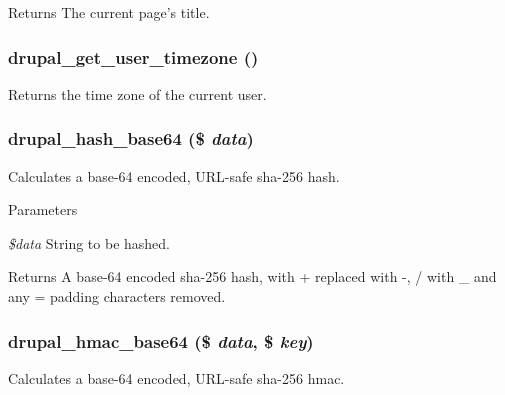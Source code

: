 \begin{DoxyReturn}{Returns}
The current page's title. 
\end{DoxyReturn}
\hypertarget{bootstrap_8inc_aab3e512ebe00778d1f7fe97db22b4d9d}{
\subsubsection[{drupal\_\-get\_\-user\_\-timezone}]{\setlength{\rightskip}{0pt plus 5cm}drupal\_\-get\_\-user\_\-timezone ()}}
\label{bootstrap_8inc_aab3e512ebe00778d1f7fe97db22b4d9d}
Returns the time zone of the current user. \hypertarget{bootstrap_8inc_afaa1b21aee7b2e06ee3f868065fdbcc1}{
\subsubsection[{drupal\_\-hash\_\-base64}]{\setlength{\rightskip}{0pt plus 5cm}drupal\_\-hash\_\-base64 (\$ {\em data})}}
\label{bootstrap_8inc_afaa1b21aee7b2e06ee3f868065fdbcc1}
Calculates a base-\/64 encoded, URL-\/safe sha-\/256 hash.


\begin{DoxyParams}{Parameters}
\item[{\em \$data}]String to be hashed.\end{DoxyParams}
\begin{DoxyReturn}{Returns}
A base-\/64 encoded sha-\/256 hash, with + replaced with -\/, / with \_\- and any = padding characters removed. 
\end{DoxyReturn}
\hypertarget{bootstrap_8inc_a677ac93b9fcba24a3ffeb02e08ca8e9a}{
\subsubsection[{drupal\_\-hmac\_\-base64}]{\setlength{\rightskip}{0pt plus 5cm}drupal\_\-hmac\_\-base64 (\$ {\em data}, \/  \$ {\em key})}}
\label{bootstrap_8inc_a677ac93b9fcba24a3ffeb02e08ca8e9a}
Calculates a base-\/64 encoded, URL-\/safe sha-\/256 hmac.



